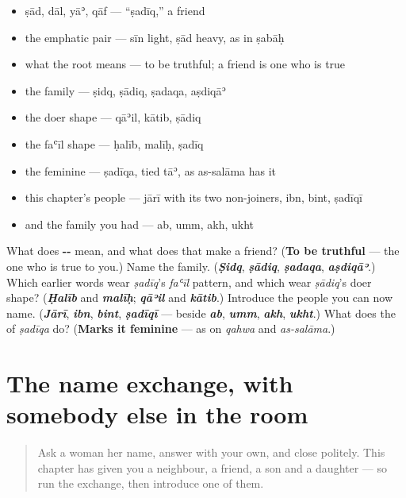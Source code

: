 \begin{itemize}
\raggedright
  \item ṣād, dāl, yāʾ, qāf — \textquotedblleft{}ṣadīq,\textquotedblright{} a friend
  \item the emphatic pair — sīn light, ṣād heavy, as in ṣabāḥ
  \item what the root means — to be truthful; a friend is one who is true
  \item the family — ṣidq, ṣādiq, ṣadaqa, aṣdiqāʾ
  \item the doer shape — qāʾil, kātib, ṣādiq
  \item the faʿīl shape — ḥalīb, malīḥ, ṣadīq
  \item the feminine — ṣadīqa, tied tāʾ, as as-salāma has it
  \item this chapter's people — jārī with its two non-joiners, ibn, bint, ṣadīqī
  \item and the family you had — ab, umm, akh, ukht
\end{itemize}

\begin{tcolorbox}[breakable,colback=teal!4,colframe=teal!35!black,title={Before you move on}]
What does \textbf{--} mean, and what does that make a friend? (\textbf{To be truthful} — the one who is true to you.) Name the family. (\emph{\textbf{Ṣidq}}, \emph{\textbf{ṣādiq}}, \emph{\textbf{ṣadaqa}}, \emph{\textbf{aṣdiqāʾ}}.) Which earlier words wear \emph{ṣadīq}'s \emph{faʿīl} pattern, and which wear \emph{ṣādiq}'s doer shape? (\emph{\textbf{Ḥalīb}} and \emph{\textbf{malīḥ}}; \emph{\textbf{qāʾil}} and \emph{\textbf{kātib}}.) Introduce the people you can now name. (\emph{\textbf{Jārī}}, \emph{\textbf{ibn}}, \emph{\textbf{bint}}, \emph{\textbf{ṣadīqī}} — beside \emph{\textbf{ab}}, \emph{\textbf{umm}}, \emph{\textbf{akh}}, \emph{\textbf{ukht}}.) What does the \textbf{} of \emph{ṣadīqa} do? (\textbf{Marks it feminine} — as on \emph{qahwa} and \emph{as-salāma}.)
\end{tcolorbox}
\section[\texorpdfstring{\ar{ما} \ar{اسمك؟} · \ar{تشرفنا} (mā ismuka? …)}{ما اسمك؟ · تشرفنا (mā ismuka? …)}]{The name exchange, with somebody else in the room}

\label{lesson:AR-R35-the-name-exchange-again}



\begin{quote}
Ask a woman her name, answer with your own, and close politely. This chapter has given you a neighbour, a friend, a son and a daughter — so run the exchange, then introduce one of them.
\end{quote}

